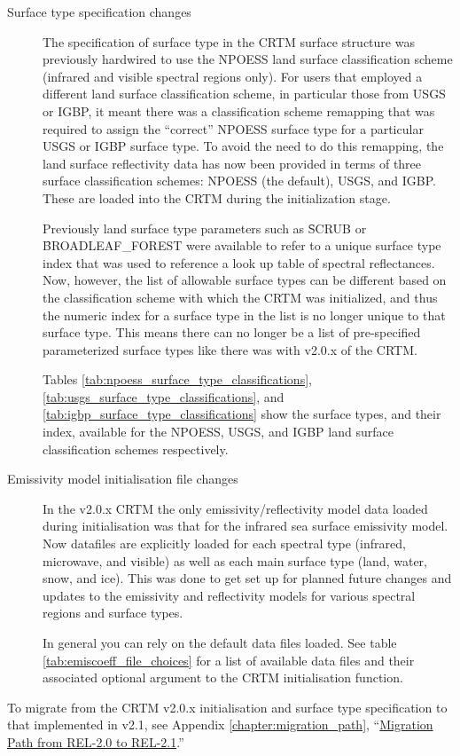 \begin{description}
\item[Surface type specification changes] The specification of surface type in the CRTM surface structure was previously hardwired to use the NPOESS land surface classification scheme (infrared and visible spectral regions only). For users that employed a different land surface classification scheme, in particular those from USGS or IGBP, it meant there was a classification scheme remapping that was required to assign the ``correct'' NPOESS surface type for a particular USGS or IGBP surface type. To avoid the need to do this remapping, the land surface reflectivity data has now been provided in terms of three surface classification schemes: NPOESS (the default), USGS, and IGBP. These are loaded into the CRTM during the initialization stage.

Previously land surface type parameters such as \f{SCRUB} or \f{BROADLEAF\_FOREST} were available to refer to a unique surface type index that was used to reference a look up table of spectral reflectances. Now, however, the list of allowable surface types can be different based on the classification scheme with which the CRTM was initialized, and thus the numeric index for a surface type in the list is no longer unique to that surface type. This means there can no longer be a list of pre-specified parameterized surface types like there was with v2.0.x of the CRTM.

Tables \ref{tab:npoess_surface_type_classifications}, \ref{tab:usgs_surface_type_classifications}, and \ref{tab:igbp_surface_type_classifications} show the surface types, and their index, available for the NPOESS, USGS, and IGBP land surface classification schemes respectively.

\item[Emissivity model initialisation file changes] In the v2.0.x CRTM the only emissivity/reflectivity model data loaded during initialisation was that for the infrared sea surface emissivity model. Now datafiles are explicitly loaded for each spectral type (infrared, microwave, and visible) as well as each main surface type (land, water, snow, and ice). This was done to get set up for planned future changes and updates to the emissivity and reflectivity models for various spectral regions and surface types.

In general you can rely on the default data files loaded. See table \ref{tab:emiscoeff_file_choices} for a list of available data files and their associated optional argument to the CRTM initialisation function.

\end{description}


To migrate from the CRTM v2.0.x initialisation and surface type specification to that implemented in v2.1, see Appendix \ref{chapter:migration_path}, ``\hyperref[chapter:migration_path]{Migration Path from REL-2.0 to REL-2.1}.''


